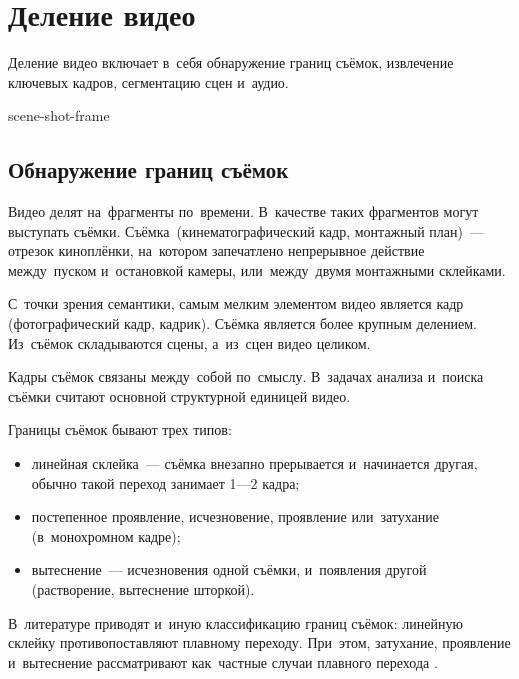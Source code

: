 
\section{Деление видео}

Деление видео включает в~себя обнаружение границ съёмок,
извлечение ключевых кадров, сегментацию сцен и~аудио.

\begin{figured}
    {scene-shot-frame}
\end{figured}

\subsection{Обнаружение границ съёмок}

Видео делят на~фрагменты по~времени.
В~качестве таких фрагментов могут выступать съёмки.
Съёмка\ (кинематографический кадр,
монтажный план)~— отрезок киноплёнки,
на~котором запечатлено непрерывное действие между~пуском
и~остановкой камеры, или~между~двумя монтажными склейками.

С~точки зрения семантики, самым мелким элементом видео является кадр
(фотографический кадр, кадрик).
Съёмка является более крупным делением.
Из~съёмок складываются сцены, а~из~сцен видео целиком.

Кадры съёмок связаны между~собой по~смыслу.
В~задачах анализа и~поиска съёмки считают
основной структурной единицей видео.

\noindent
Границы съёмок бывают трех типов:
\begin{itemize}
    \item линейная склейка~— съёмка внезапно
            прерывается и~начинается другая,
            обычно такой переход занимает 1—2 кадра;
    \item постепенное проявление, исчезновение, проявление или~затухание
            (в~монохромном кадре);
    \item вытеснение~— исчезновения одной съёмки,
            и~появления другой (растворение, вытеснение шторкой).
\end{itemize}

В~литературе приводят и~иную классификацию границ съёмок:
линейную склейку противопоставляют плавному переходу.
При~этом, затухание, проявление и~вытеснение
рассматривают как~частные случаи плавного перехода \cite{Hattarge:2014}.


